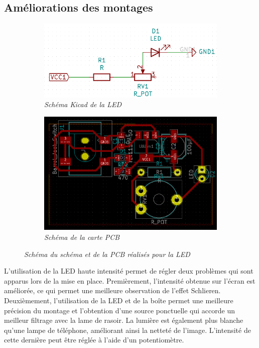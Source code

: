 \subsection{Améliorations des montages}
\begin{figure}[H]
	\centering
	\begin{subfigure}[t]{0.49\textwidth}
		\centering
		\includegraphics[scale=0.2]{figures/schema_kicad.png}
		\caption{\small{\textit{Schéma Kicad de la LED}}}
		\label{fig:led_kicad}
	\end{subfigure}%
	\begin{subfigure}[t]{0.49\textwidth}
		\centering
		\includegraphics[scale=0.2]{figures/schema_pcb.png}
		\caption{\small{\textit{Schéma de la carte PCB}}}
		\label{fig:led_pcb}
	\end{subfigure}
	\caption{\small{\textit{Schéma du schéma et de la PCB réalisés pour la LED}}}
	\label{fig:led}
\end{figure}
L’utilisation de la LED haute intensité permet de régler deux problèmes qui sont apparus lors de la mise en place. Premièrement, l’intensité obtenue sur l’écran est améliorée, ce qui permet une meilleure observation de l’effet Schlieren. Deuxièmement, l’utilisation de la LED et de la boîte permet une meilleure précision du montage et l’obtention d’une source ponctuelle qui accorde un meilleur filtrage avec la lame de rasoir. La lumière est également plus blanche qu’une lampe de téléphone, améliorant ainsi la netteté de l’image. L’intensité de cette dernière peut être réglée à l’aide d’un potentiomètre.
